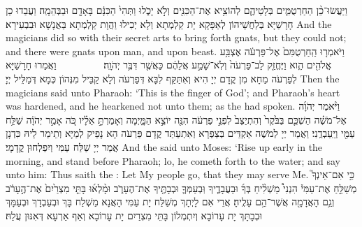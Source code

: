 {וַיַּעֲשׂוּ־כֵ֨ן הַחַרְטֻמִּ֧ים בְּלָטֵיהֶ֛ם לְהוֹצִ֥יא אֶת־הַכִּנִּ֖ים וְלֹ֣א יָכֹ֑לוּ וַתְּהִי֙ הַכִּנָּ֔ם בָּאָדָ֖ם וּבַבְּהֵמָֽה׃
}
{וַעֲבַדוּ כֵן חָרָשַׁיָּא בְּלַחֲשֵׁיהוֹן לְאַפָּקָא יָת קַלְמְתָא וְלָא יְכִילוּ וַהֲוָת קַלְמְתָא בַּאֲנָשָׁא וּבִבְעִירָא׃}
{And the magicians did so with their secret arts to bring forth gnats, but they could not; and there were gnats upon man, and upon beast.}{}
{וַיֹּאמְר֤וּ הַֽחַרְטֻמִּם֙ אֶל־פַּרְעֹ֔ה אֶצְבַּ֥ע אֱלֹהִ֖ים הִ֑וא וַיֶּחֱזַ֤ק לֵב־פַּרְעֹה֙ וְלֹֽא־שָׁמַ֣ע אֲלֵהֶ֔ם כַּאֲשֶׁ֖ר דִּבֶּ֥ר יְהֹוָֽה׃ \setuma         
}
{וַאֲמַרוּ חָרָשַׁיָּא לְפַרְעֹה מַחָא מִן קֳדָם יְיָ הִיא וְאִתַּקַּף לִבָּא דְּפַרְעֹה וְלָא קַבֵּיל מִנְּהוֹן כְּמָא דְּמַלֵּיל יְיָ׃}
{Then the magicians said unto Pharaoh: ‘This is the finger of God’; and Pharaoh’s heart was hardened, and he hearkened not unto them; as the \lord\space had spoken.}{}
{וַיֹּ֨אמֶר יְהֹוָ֜ה אֶל־מֹשֶׁ֗ה הַשְׁכֵּ֤ם בַּבֹּ֙קֶר֙ וְהִתְיַצֵּב֙ לִפְנֵ֣י פַרְעֹ֔ה הִנֵּ֖ה יוֹצֵ֣א הַמָּ֑יְמָה וְאָמַרְתָּ֣ אֵלָ֗יו כֹּ֚ה אָמַ֣ר יְהֹוָ֔ה שַׁלַּ֥ח עַמִּ֖י וְיַֽעַבְדֻֽנִי׃}
{וַאֲמַר יְיָ לְמֹשֶׁה אַקְדֵּים בְּצַפְרָא וְאִתְעַתַּד קֳדָם פַּרְעֹה הָא נָפֵיק לְמַיָּא וְתֵימַר לֵיהּ כִּדְנָן אֲמַר יְיָ שַׁלַּח עַמִּי וְיִפְלְחוּן קֳדָמָי׃}
{And the \lord\space said unto Moses: ‘Rise up early in the morning, and stand before Pharaoh; lo, he cometh forth to the water; and say unto him: Thus saith the \lord: Let My people go, that they may serve Me.}{}
{כִּ֣י אִם־אֵינְךָ֮ מְשַׁלֵּ֣חַ אֶת־עַמִּי֒ הִנְנִי֩ מַשְׁלִ֨יחַ בְּךָ֜ וּבַעֲבָדֶ֧יךָ וּֽבְעַמְּךָ֛ וּבְבָתֶּ֖יךָ אֶת־הֶעָרֹ֑ב וּמָ֨לְא֜וּ בָּתֵּ֤י מִצְרַ֙יִם֙ אֶת־הֶ֣עָרֹ֔ב וְגַ֥ם הָאֲדָמָ֖ה אֲשֶׁר־הֵ֥ם עָלֶֽיהָ׃
}
{אֲרֵי אִם לָיְתָךְ מְשַׁלַּח יָת עַמִּי הָאֲנָא מַשְׁלַח בָּךְ וּבְעַבְדָךְ וּבְעַמָּךְ וּבְבָתָּךְ יָת עָרוֹבָא וְיִתְמְלוֹן בָּתֵּי מִצְרַיִם יָת עָרוֹבָא וְאַף אַרְעָא דְּאִנּוּן עֲלַהּ׃}
